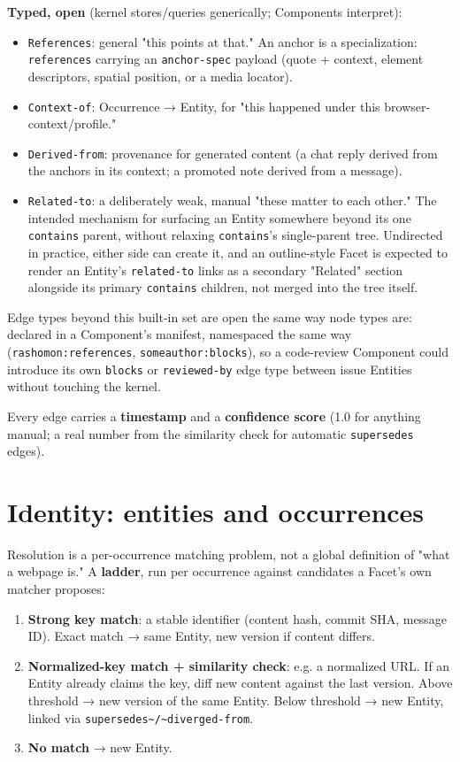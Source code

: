 \documentclass[11pt]{article}
\begin{document}
\textbf{Typed, open} (kernel stores/queries generically; Components interpret):

\begin{itemize}
\item \texttt{References}: general "this points at that." An anchor is a specialization: \texttt{references} carrying an \texttt{anchor-spec} payload (quote + context, element descriptors, spatial position, or a media locator).
\item \texttt{Context-of}: Occurrence → Entity, for "this happened under this browser-context/profile."
\item \texttt{Derived-from}: provenance for generated content (a chat reply derived from the anchors in its context; a promoted note derived from a message).
\item \texttt{Related-to}: a deliberately weak, manual "these matter to each other." The intended mechanism for surfacing an Entity somewhere beyond its one \texttt{contains} parent, without relaxing \texttt{contains}'s single-parent tree. Undirected in practice, either side can create it, and an outline-style Facet is expected to render an Entity's \texttt{related-to} links as a secondary "Related" section alongside its primary \texttt{contains} children, not merged into the tree itself.
\end{itemize}

Edge types beyond this built-in set are open the same way node types are: declared in a Component's manifest, namespaced the same way (\texttt{rashomon:references}, \texttt{someauthor:blocks}), so a code-review Component could introduce its own \texttt{blocks} or \texttt{reviewed-by} edge type between issue Entities without touching the kernel.

Every edge carries a \textbf{timestamp} and a \textbf{confidence score} (1.0 for anything manual; a real number from the similarity check for automatic \texttt{supersedes} edges).
\section{Identity: entities and occurrences}
\label{sec:orgb040e6f}

Resolution is a per-occurrence matching problem, not a global definition of "what a webpage is." A \textbf{ladder}, run per occurrence against candidates a Facet's own matcher proposes:

\begin{enumerate}
\item \textbf{Strong key match}: a stable identifier (content hash, commit SHA, message ID). Exact match → same Entity, new version if content differs.
\item \textbf{Normalized-key match + similarity check}: e.g. a normalized URL. If an Entity already claims the key, diff new content against the last version. Above threshold → new version of the same Entity. Below threshold → new Entity, linked via \texttt{supersedes\textasciitilde{}/\textasciitilde{}diverged-from}.
\item \textbf{No match} → new Entity.
\end{enumerate}
\end{document}
